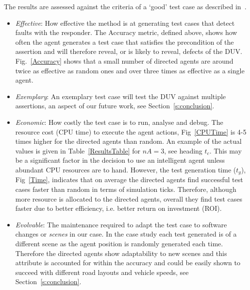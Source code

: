 \documentclass[letterpaper, 10 pt, journal, twoside]{IEEEtran}
\begin{document}

The results are assessed against the criteria of a `good' test case as described in~\cite{fewster1999software}.
\begin{itemize}
	\item \textit{Effective}: How effective the method is at generating test cases that detect faults with the responder. The Accuracy metric, defined above, shows how often the agent generates a test case that satisfies the precondition of the assertion and will therefore reveal, or is likely to reveal, defects of the DUV. Fig.~\ref{Accuracy} shows that a small number of directed agents are around twice as effective as random ones and over three times as effective as a single agent.
	\item \textit{Exemplary}: An exemplary test case will test the DUV against multiple assertions, an aspect of our future work, see Section~\ref{s:conclusion}. 
	\item \textit{Economic}: How costly the test case is to run, analyse and debug. The resource cost (CPU time) to execute the agent actions, Fig~\ref{CPUTime} is 4-5 times higher for the directed agents than random. An example of the actual values is given in Table~\ref{ResultsTable} for $nA=3$, see heading $t_{c}$. 
	This may be a significant factor in the decision to use an intelligent agent unless abundant CPU resources are to hand. %
	However, the test generation time ($t_g$), Fig~\ref{Time}, indicates that on average the directed agents find successful test cases faster than random in terms of simulation ticks. Therefore, although more resource is allocated to the directed agents, overall they find test cases faster due to better efficiency, i.e. better return on investment (ROI).
	\item \textit{Evolvable}: The maintenance required to adapt the test case to software changes or \textit{scenes} in our case. In the case study each test generated is of a different scene as the agent position is randomly generated each time. Therefore the directed agents show adaptability to new scenes and this attribute is accounted for within the accuracy and could be easily shown to succeed with different road layouts and vehicle speeds, see Section~\ref{s:conclusion}.
\end{itemize}
\end{document}
